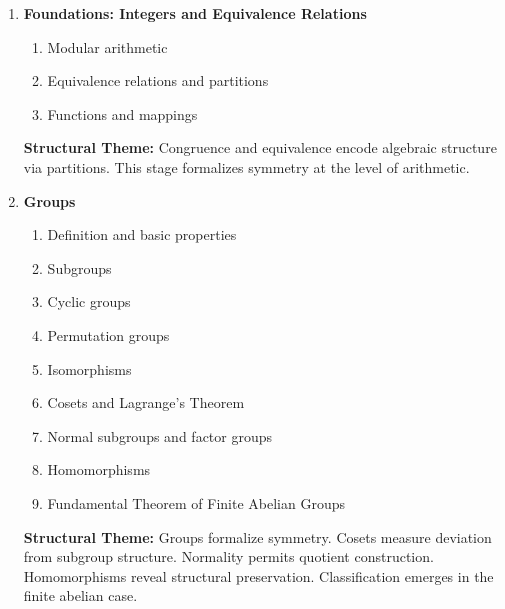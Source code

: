 \begin{enumerate}


\item \textbf{Foundations: Integers and Equivalence Relations}

\begin{enumerate}
    \item Modular arithmetic
    \item Equivalence relations and partitions
    \item Functions and mappings
\end{enumerate}

\vspace{0.5em}
\textbf{Structural Theme:}
Congruence and equivalence encode algebraic structure via partitions.
This stage formalizes symmetry at the level of arithmetic.


\item \textbf{Groups}

\begin{enumerate}
    \item Definition and basic properties
    \item Subgroups
    \item Cyclic groups
    \item Permutation groups
    \item Isomorphisms
    \item Cosets and Lagrange’s Theorem
    \item Normal subgroups and factor groups
    \item Homomorphisms
    \item Fundamental Theorem of Finite Abelian Groups
\end{enumerate}

\vspace{0.5em}
\textbf{Structural Theme:}
Groups formalize symmetry.
Cosets measure deviation from subgroup structure.
Normality permits quotient construction.
Homomorphisms reveal structural preservation.
Classification emerges in the finite abelian case.



\end{enumerate}
